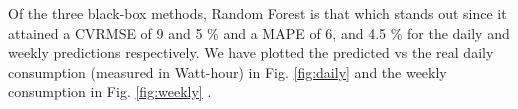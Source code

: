 \documentclass[10pt, conference, compsocconf]{IEEEtran}
\begin{document}
Of the three black-box methods, Random Forest is that which stands out since it attained a CVRMSE of 9 and 5 \%  and a MAPE of 6, and 4.5 \% for the daily and weekly predictions respectively. We have plotted the predicted vs the real daily consumption (measured in Watt-hour) in Fig. \ref{fig:daily} and the weekly consumption in Fig. \ref{fig:weekly} .

\begin{center}
\end{center}




\end{document}
